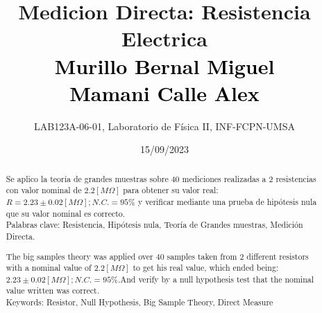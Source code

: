 \documentclass[11pt]{article}
\title{\textbf{Medicion Directa: Resistencia Electrica}\\{\textcolor{black}{Murillo Bernal Miguel\\Mamani Calle Alex}}}
\author{LAB123A-06-01, Laboratorio de Física II, INF-FCPN-UMSA}
\date{15/09/2023}
\begin{document}
    \maketitle
    \begin{abstract}
        \noindent Se aplico la teoría de grandes muestras sobre 40 mediciones realizadas a 2 resistencias con valor nominal
        de $2.2[M\Omega]$ para obtener su valor real: $R = 2.23\pm0.02\left[ M\Omega \right]; N.C. = 95\% $
        y verificar mediante una prueba de hipótesis nula que su valor nominal es correcto. \\
        Palabras clave: Resistencia, Hipótesis nula, Teoría de Grandes muestras, Medición Directa.
    \end{abstract}
    \begin{abstract}
        \noindent The big samples theory was applied over 40 samples taken from 2 different resistors
        with a nominal value of $2.2[M\Omega]$ to get his real value, which ended being:
        $2.23\pm0.02\left[ M\Omega \right]; N.C. = 95\% $.And verify by a null hypothesis
        test that the nominal value written was correct. \\

        Keywords: Resistor, Null Hypothesis, Big Sample Theory, Direct Measure
    \end{abstract}
\end{document}
